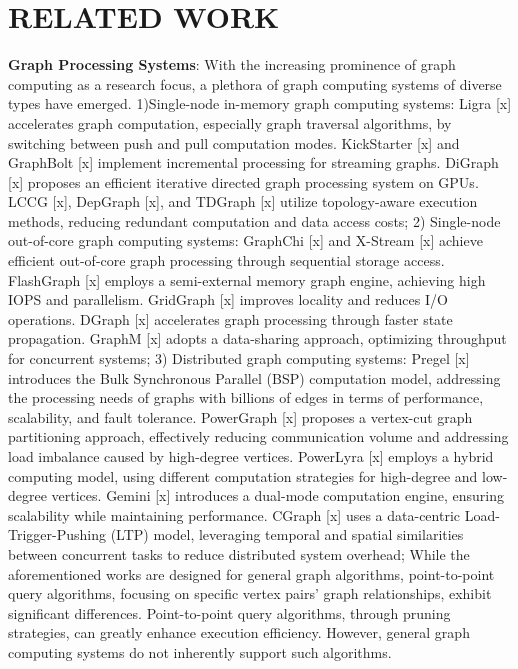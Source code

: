 \documentclass[lettersize,journal]{IEEEtran} %
\begin{document}
\section{RELATED WORK}
{\bf{Graph Processing Systems}}: With the increasing prominence of graph computing as a research focus, a plethora of graph computing systems of diverse types have emerged. 1)Single-node in-memory graph computing systems: Ligra [x] accelerates graph computation, especially graph traversal algorithms, by switching between push and pull computation modes. KickStarter [x] and GraphBolt [x] implement incremental processing for streaming graphs. DiGraph [x] proposes an efficient iterative directed graph processing system on GPUs. LCCG [x], DepGraph [x], and TDGraph [x] utilize topology-aware execution methods, reducing redundant computation and data access costs; 2) Single-node out-of-core graph computing systems: GraphChi [x] and X-Stream [x] achieve efficient out-of-core graph processing through sequential storage access. FlashGraph [x] employs a semi-external memory graph engine, achieving high IOPS and parallelism. GridGraph [x] improves locality and reduces I/O operations. DGraph [x] accelerates graph processing through faster state propagation. GraphM [x] adopts a data-sharing approach, optimizing throughput for concurrent systems; 3) Distributed graph computing systems: Pregel [x] introduces the Bulk Synchronous Parallel (BSP) computation model, addressing the processing needs of graphs with billions of edges in terms of performance, scalability, and fault tolerance. PowerGraph [x] proposes a vertex-cut graph partitioning approach, effectively reducing communication volume and addressing load imbalance caused by high-degree vertices. PowerLyra [x] employs a hybrid computing model, using different computation strategies for high-degree and low-degree vertices. Gemini [x] introduces a dual-mode computation engine, ensuring scalability while maintaining performance. CGraph [x] uses a data-centric Load-Trigger-Pushing (LTP) model, leveraging temporal and spatial similarities between concurrent tasks to reduce distributed system overhead; While the aforementioned works are designed for general graph algorithms, point-to-point query algorithms, focusing on specific vertex pairs' graph relationships, exhibit significant differences. Point-to-point query algorithms, through pruning strategies, can greatly enhance execution efficiency. However, general graph computing systems do not inherently support such algorithms.
\end{document}
